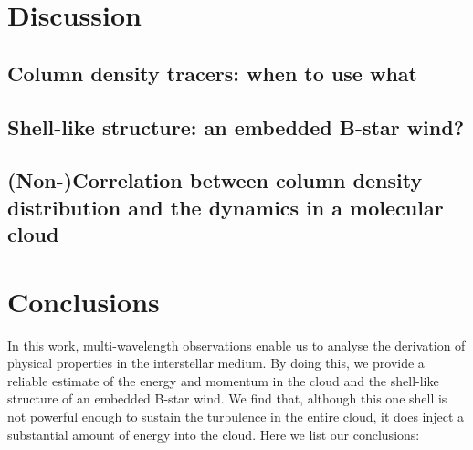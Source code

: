 \documentclass[11pt,a4paper]{emulateapj}
\begin{document}
\section{Discussion}
\label{sec:discussion}

\subsection{Column density tracers: when to use what}

\subsection{Shell-like structure: an embedded B-star wind?}

\subsection{(Non-)Correlation between column density distribution and the dynamics in a molecular cloud}

\section{Conclusions}
In this work, multi-wavelength observations enable us to analyse the derivation of physical properties in the interstellar medium. By doing this, we provide a reliable estimate of the energy and momentum in the cloud and the shell-like structure of an embedded B-star wind. We find that, although this one shell is not powerful enough to sustain the turbulence in the entire cloud, it does inject a substantial amount of energy into the cloud. Here we list our conclusions:
\end{document}

